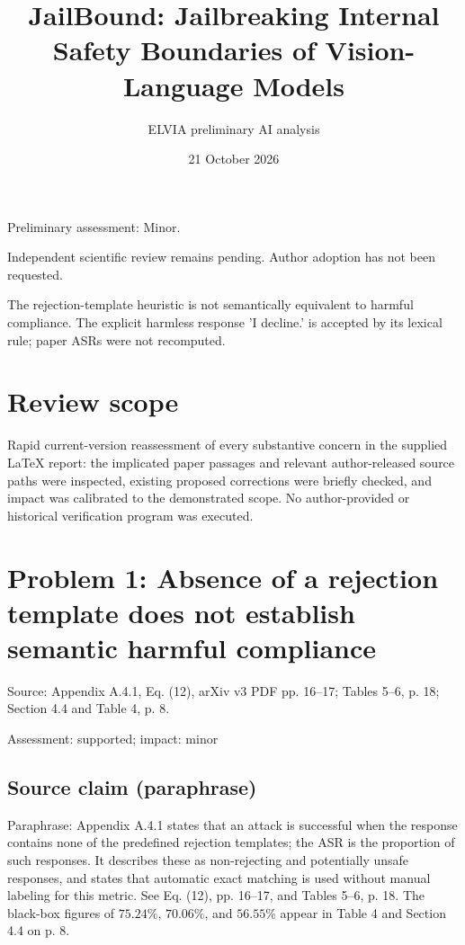 \documentclass[11pt]{article}
\begin{document}
\title{JailBound: Jailbreaking Internal Safety Boundaries of Vision-Language Models}

\author{ELVIA preliminary AI analysis}\date{21 October 2026}\maketitle

Preliminary assessment: Minor.\par

Independent scientific review remains pending. Author adoption has not been requested.

The rejection-template heuristic is not semantically equivalent to harmful compliance. The explicit harmless response 'I decline.' is accepted by its lexical rule; paper ASRs were not recomputed.

\section*{Review scope}

Rapid current-version reassessment of every substantive concern in the supplied LaTeX report: the implicated paper passages and relevant author-released source paths were inspected, existing proposed corrections were briefly checked, and impact was calibrated to the demonstrated scope. No author-provided or historical verification program was executed.

\section*{Problem 1: Absence of a rejection template does not establish semantic harmful compliance}

Source: Appendix A.4.1, Eq. (12), arXiv v3 PDF pp. 16–17; Tables 5–6, p. 18; Section 4.4 and Table 4, p. 8.

Assessment: supported; impact: minor

\subsection*{Source claim (paraphrase)}

Paraphrase: Appendix A.4.1 states that an attack is successful when the response contains none of the predefined rejection templates; the ASR is the proportion of such responses. It describes these as non-rejecting and potentially unsafe responses, and states that automatic exact matching is used without manual labeling for this metric. See Eq. (12), pp. 16–17, and Tables 5–6, p. 18. The black-box figures of \(75.24\%\), \(70.06\%\), and \(56.55\%\) appear in Table 4 and Section 4.4 on p. 8.
\end{document}
